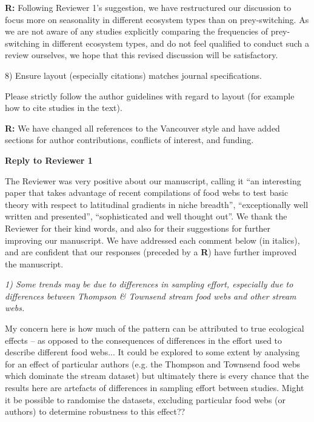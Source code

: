 \documentclass[12pt]{letter}
\newenvironment{refquote}{\bigskip \begin{it}}{\end{it}\smallskip}
\begin{document}
  \textbf{R:} Following Reviewer 1's suggestion, we have 
    restructured our discussion
    to focus more on seasonality in different ecosystem types than on prey-switching.
    As we are not aware of any studies explicitly comparing the frequencies of 
    prey-switching in different ecosystem types, and do not feel qualified to conduct
    such a review ourselves, we hope that this revised discussion will be satisfactory.


  8) Ensure layout (especially citations) matches journal specifications.

  \begin{refquote}

    Please strictly follow the author guidelines with regard to layout (for
    example how to cite studies in the text).

  \end{refquote}

  \textbf{R:} We have changed all references to the Vancouver style and have 
    added sections for author contributions, conflicts of interest, and funding.

  \newpage

{\Large \bf Reply to Reviewer 1}

  The Reviewer was very positive about our manuscript, calling it
  ``an interesting paper that takes advantage of recent compilations
  of food webs to test basic theory with respect to latitudinal gradients in
  niche breadth'', ``exceptionally well written and presented'', ``sophisticated
  and well thought out''. We thank the Reviewer for their kind words,
  and also for their suggestions for further improving our manuscript. We
  have addressed each comment below (in italics), and are confident that our
  responses (preceded by a \textbf{R}) have further improved the manuscript.
  

  \emph{
  1) Some trends may be due to differences in sampling effort, especially
  due to differences between Thompson \& Townsend stream food webs and other
  stream webs.}


  \begin{refquote}

    My concern here is how much of the pattern can be attributed to true
    ecological effects – as opposed to the consequences of differences in the
    effort used to describe different food webs... It could be explored to some extent by
    analysing for an effect of particular authors (e.g. the Thompson and
    Townsend food webs which dominate the stream dataset) but ultimately there
    is every chance that the results here are artefacts of differences in
    sampling effort between studies. Might it be possible to randomise the
    datasets, excluding particular food webs (or authors) to determine
    robustness to this effect?? 

  \end{refquote}
\end{document}
